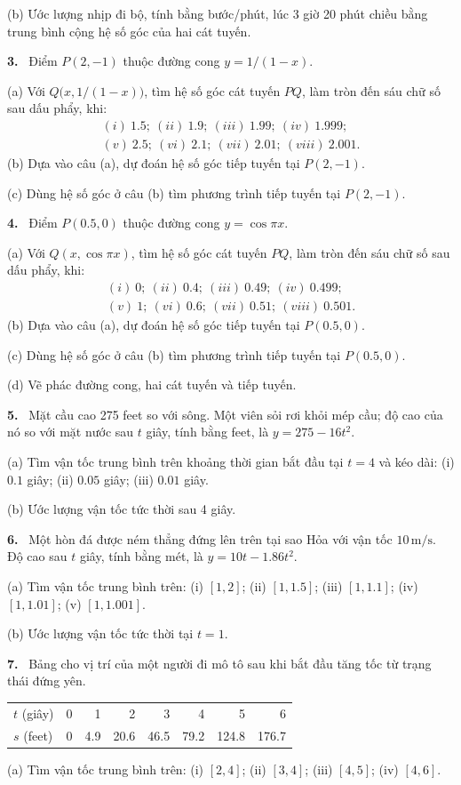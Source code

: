 \documentclass[12pt,a4paper]{article}
\newcommand{\bt}[1]{\par\smallskip\noindent\textbf{#1.}\ }
\begin{document}
(b) Ước lượng nhịp đi bộ, tính bằng bước/phút, lúc 3 giờ 20 phút chiều bằng trung bình cộng hệ số góc của hai cát tuyến.
\bt{3} Điểm $P(2,-1)$ thuộc đường cong $y=1/(1-x)$.

(a) Với $Q\bigl(x,1/(1-x)\bigr)$, tìm hệ số góc cát tuyến $PQ$, làm tròn đến sáu chữ số sau dấu phẩy, khi:
\[\begin{gathered}(i)\ 1.5;\ (ii)\ 1.9;\ (iii)\ 1.99;\ (iv)\ 1.999;\\[3pt](v)\ 2.5;\ (vi)\ 2.1;\ (vii)\ 2.01;\ (viii)\ 2.001.\end{gathered}\]
(b) Dựa vào câu (a), dự đoán hệ số góc tiếp tuyến tại $P(2,-1)$.

(c) Dùng hệ số góc ở câu (b) tìm phương trình tiếp tuyến tại $P(2,-1)$.
\bt{4} Điểm $P(0.5,0)$ thuộc đường cong $y=\cos\pi x$.

(a) Với $Q(x,\cos\pi x)$, tìm hệ số góc cát tuyến $PQ$, làm tròn đến sáu chữ số sau dấu phẩy, khi:
\[\begin{gathered}(i)\ 0;\ (ii)\ 0.4;\ (iii)\ 0.49;\ (iv)\ 0.499;\\[3pt](v)\ 1;\ (vi)\ 0.6;\ (vii)\ 0.51;\ (viii)\ 0.501.\end{gathered}\]
(b) Dựa vào câu (a), dự đoán hệ số góc tiếp tuyến tại $P(0.5,0)$.

(c) Dùng hệ số góc ở câu (b) tìm phương trình tiếp tuyến tại $P(0.5,0)$.

(d) Vẽ phác đường cong, hai cát tuyến và tiếp tuyến.
\bt{5} Mặt cầu cao 275 feet so với sông. Một viên sỏi rơi khỏi mép cầu; độ cao của nó so với mặt nước sau $t$ giây, tính bằng feet, là $y=275-16t^2$.

(a) Tìm vận tốc trung bình trên khoảng thời gian bắt đầu tại $t=4$ và kéo dài: (i) $0.1$ giây; (ii) $0.05$ giây; (iii) $0.01$ giây.

(b) Ước lượng vận tốc tức thời sau 4 giây.
\bt{6} Một hòn đá được ném thẳng đứng lên trên tại sao Hỏa với vận tốc $10\,\mathrm{m/s}$. Độ cao sau $t$ giây, tính bằng mét, là $y=10t-1.86t^2$.

(a) Tìm vận tốc trung bình trên: (i) $[1,2]$; (ii) $[1,1.5]$; (iii) $[1,1.1]$; (iv) $[1,1.01]$; (v) $[1,1.001]$.

(b) Ước lượng vận tốc tức thời tại $t=1$.
\bt{7} Bảng cho vị trí của một người đi mô tô sau khi bắt đầu tăng tốc từ trạng thái đứng yên.
\begin{center}\begin{tabular}{lrrrrrrr}\toprule
$t$ (giây)&0&1&2&3&4&5&6\\
$s$ (feet)&0&4.9&20.6&46.5&79.2&124.8&176.7\\\bottomrule\end{tabular}\end{center}
(a) Tìm vận tốc trung bình trên: (i) $[2,4]$; (ii) $[3,4]$; (iii) $[4,5]$; (iv) $[4,6]$.
\end{document}
